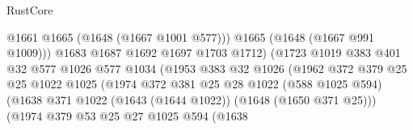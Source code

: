 \begin{lexlean}{RustCore}
\begin{coremodule}
                                            @1661
                                            @1665
                                            (@1648 (@1667 @1001 @577)))
                                          @1665
                                          (@1648 (@1667 @991 @1009)))
                                        @1683
                                        @1687
                                        @1692
                                        @1697
                                        @1703
                                        @1712)
                                      (@1723
                                        @1019
                                        @383
                                        @401
                                        @32
                                        @577
                                        @1026
                                        @577
                                        @1034
                                        (@1953
                                          @383
                                          @32
                                          @1026
                                          (@1962
                                            @372
                                            @379
                                            @25
                                            @25
                                            @1022
                                            @1025
                                            (@1974
                                              @372
                                              @381
                                              @25
                                              @28
                                              @1022
                                              (@588 @1025 @594)
                                              (@1638
                                                @371
                                                @1022
                                                (@1643 (@1644 @1022))
                                                (@1648 (@1650 @371 @25)))
                                              (@1974
                                                @379
                                                @53
                                                @25
                                                @27
                                                @1025
                                                @594
                                                (@1638

\end{coremodule}
\end{lexlean}
